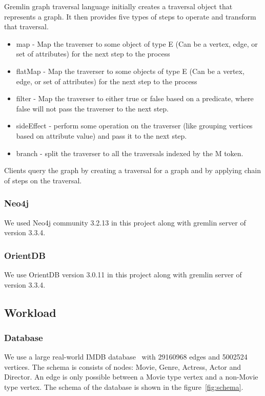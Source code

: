 Gremlin graph traversal language initially creates a traversal object that represents a graph. It then provides five types of steps to operate and transform that traversal. 

\begin{itemize}
\item map - Map the traverser to some object of type E (Can be a vertex, edge, or set of attributes) for the next step to the process
\item flatMap - Map the traverser to some objects of type E (Can be a vertex, edge, or set of attributes) for the next step to the process
\item filter - Map the traverser to either true or false based on a predicate, where false will not pass the traverser to the next step.
\item sideEffect - perform some operation on the traverser (like grouping vertices based on attribute value) and pass it to the next step. 
\item branch - split the traverser to all the traversals indexed by the M token.
\end{itemize}

Clients query the graph by creating a traversal for a graph and by applying chain of steps on the traversal.

\subsubsection{Neo4j}

We used Neo4j community 3.2.13 in this project along with gremlin server of version 3.3.4.

\subsubsection{OrientDB}

We use OrientDB version 3.0.11 in this project along with gremlin server of version 3.3.4.

\subsection{Workload}

\subsubsection{Database}

We use a large real-world IMDB database~\cite{IMDb96:online} with 29160968 edges and 5002524 vertices. The schema is consists of nodes: Movie, Genre,
Actress, Actor and Director. An edge is only possible between a Movie type vertex and a non-Movie type vertex. 
The schema of the database is shown in the figure~\ref{fig:schema}. 


